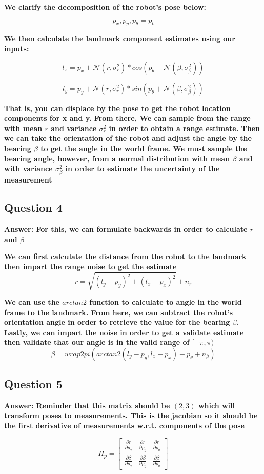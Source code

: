 \documentclass[12pt, a4paper]{article}
\begin{document}
\textbf{We clarify the decomposition of the robot's pose below:}

$$p_x, p_y, p_{\theta} = p_t$$

\textbf{We then calculate the landmark component estimates using our inputs:}

$$l_x = p_x + \mathcal{N}(r, \sigma_{r}^2) * cos(p_{\theta} + \mathcal{N}(\beta, \sigma^2_{\beta})) $$ 

$$l_y = p_y + \mathcal{N}(r, \sigma_{r}^2) * sin(p_{\theta} + \mathcal{N}(\beta, \sigma^2_{\beta}))$$

\textbf{That is, you can displace by the pose to get the robot location components for x and y. From there, We can sample from the range with mean $r$ and variance $\sigma_r^2$ in order to obtain a range estimate. Then we can take the orientation of the robot and adjust the angle by the bearing $\beta$ to get the angle in the world frame. We must sample the bearing angle, however, from a normal distribution with mean $\beta$ and with variance $\sigma^2_{\beta}$ in order to estimate the uncertainty of the measurement}

\subsection{Question 4}
\textbf{Answer: For this, we can formulate backwards in order to calculate $r$ and $\beta$}

\textbf{We can first calculate the distance from the robot to the landmark then impart the range noise to get the estimate}
$$r = \sqrt{(l_y - p_y)^2 + (l_x - p_x)^2} + n_r$$

\textbf{We can use the $arctan2$ function to calculate to angle in the world frame to the landmark. From here, we can subtract the robot's orientation angle in order to retrieve the value for the bearing $\beta$. Lastly, we can impart the noise in order to get a validate estimate then validate that our angle is in the valid range of $[-\pi, \pi)$}
$$\beta = wrap2pi(arctan2(l_y - p_y, l_x - p_x) - p_{\theta} + n_{\beta})$$

\clearpage
\subsection{Question 5}
\textbf{Answer: Reminder that this matrix should be $(2,3)$ which will transform poses to measurements. This is the jacobian so it should be the first derivative of measurements w.r.t. components of the pose}

$$H_p = 
\begin{bmatrix}
    \frac{\partial r}{\partial p_x} & \frac{\partial r}{\partial p_y} & \frac{\partial r}{\partial p_{\theta}} \\
    \frac{\partial \beta}{\partial p_x} & \frac{\partial \beta}{\partial p_y} & \frac{\partial \beta}{\partial p_{\theta}}
\end{bmatrix}$$
\end{document}
